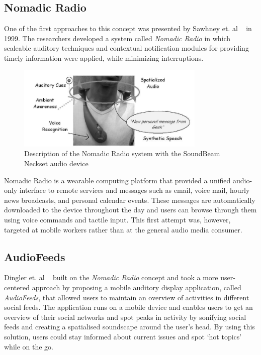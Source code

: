 \subsection{Nomadic Radio}

One of the first approaches to this concept was presented by Sawhney et. al ~\cite{Sawhney1999} in 1999. The researchers developed a system called \textit{Nomadic Radio} in which scaleable auditory techniques and contextual notification modules for providing timely information were applied, while minimizing interruptions.

\begin{figure}[h]
\centering
\includegraphics[width=0.8\textwidth]{./Images/nomadicradio.png}
\caption{Description of the Nomadic Radio system with the SoundBeam Neckset audio device}
\label{fig:test_env}
\end{figure}

Nomadic Radio is a wearable computing platform that provided a unified audio-only interface to remote services and messages such as email, voice mail, hourly news broadcasts, and personal calendar events. These messages are automatically downloaded to the device throughout the day and users can browse through them using voice commands and tactile input. This first attempt was, however, targeted at mobile workers rather than at the general audio media consumer.

\subsection{AudioFeeds}

Dingler et. al ~\cite{Dingler2010} built on the \textit{Nomadic Radio} concept and took a more user-centered approach by proposing a mobile auditory display application, called \textit{AudioFeeds}, that allowed users to maintain an overview of activities in different social feeds. The application runs on a mobile device and enables users to get an overview of their social networks and spot peaks in activity by sonifying social feeds and creating a spatialised soundscape around the user’s head. By using this solution, users could stay informed about current issues and spot ‘hot topics’ while on the go. 

